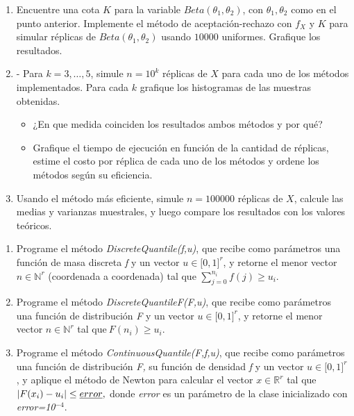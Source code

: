 \begin{enumerate}
    \item Encuentre una cota $K$ para la variable $Beta(\theta_1,\theta_2)$, con $\theta_1,\theta_2$ como en el punto anterior. Implemente el método de aceptación-rechazo con $f_X$ y $K$ para simular réplicas de $Beta(\theta_1,\theta_2)$ usando $10000$ uniformes. Grafique los resultados.
    
    \item - Para $k = 3, \dots , 5$, simule $n = 10^k$ réplicas de $X$ para cada uno de los métodos implementados. Para cada $k$ grafique los histogramas de las muestras obtenidas.

    \begin{itemize}
        \item ¿En que medida coinciden los resultados ambos métodos y por qué?
        \item Grafique el tiempo de ejecución en función de la cantidad de réplicas, estime el costo por réplica de cada uno de los métodos y ordene los métodos según su eficiencia.
    \end{itemize}
    \item Usando el método más eficiente, simule $n = 100000$ réplicas de $X$, calcule las medias y varianzas muestrales, y luego compare los resultados con los valores teóricos.
\end{enumerate}

\iffalse
\begin{enumerate}
  \item Programe el m\'{e}todo \emph{DiscreteQuantile(f,u)}, que recibe como par\'{a}metros una funci\'{o}n de masa discreta \emph{f} y un vector $u\in \lbrack 0,1]^{r}$, y retorne el menor vector $n\in\mathbb{N}^r$ (coordenada a coordenada) tal que $\sum_{j=0}^{n_i}f(j)\geq u_i.$

  \item Programe el m\'{e}todo \emph{DiscreteQuantileF(F,u)}, que recibe como par\'{a}metros una funci\'{o}n de distribuci\'{o}n \emph{F} y un vector $u\in \lbrack 0,1]^{r}$, y retorne el menor vector $n\in\mathbb{N}^r$ tal que$\ F(n_i)\geq u_i.$

\item Programe el m\'{e}todo \emph{ContinuousQuantile(F,f,u)}, que recibe como par\'{a}metros una funci\'{o}n de distribuci\'{o}n \emph{F,} su funci\'{o}n de densidad \emph{f} y un vector $u\in \lbrack 0,1]^{r}$, y aplique el m\'{e}todo de Newton para calcular el vector $x\in\mathbb{R}^r$ tal que $\left\vert F(x_{i})-u_{i}\right\vert \leq \emph{error},$ donde \emph{error} es un par\'{a}metro de la clase inicializado con \emph{error=10}$^{-4}.$
\end{enumerate}

